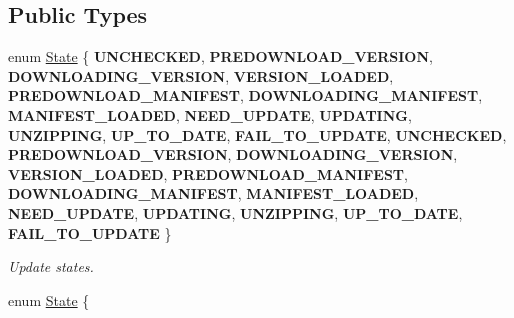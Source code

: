 \subsection*{Public Types}
\begin{DoxyCompactItemize}
\item 
\mbox{\label{classAssetsManagerEx_a50ac8909632de66eb71eb69fa66229c3}} 
enum \hyperlink{classAssetsManagerEx_a50ac8909632de66eb71eb69fa66229c3}{State} \{ \newline
{\bfseries U\+N\+C\+H\+E\+C\+K\+ED}, 
{\bfseries P\+R\+E\+D\+O\+W\+N\+L\+O\+A\+D\+\_\+\+V\+E\+R\+S\+I\+ON}, 
{\bfseries D\+O\+W\+N\+L\+O\+A\+D\+I\+N\+G\+\_\+\+V\+E\+R\+S\+I\+ON}, 
{\bfseries V\+E\+R\+S\+I\+O\+N\+\_\+\+L\+O\+A\+D\+ED}, 
\newline
{\bfseries P\+R\+E\+D\+O\+W\+N\+L\+O\+A\+D\+\_\+\+M\+A\+N\+I\+F\+E\+ST}, 
{\bfseries D\+O\+W\+N\+L\+O\+A\+D\+I\+N\+G\+\_\+\+M\+A\+N\+I\+F\+E\+ST}, 
{\bfseries M\+A\+N\+I\+F\+E\+S\+T\+\_\+\+L\+O\+A\+D\+ED}, 
{\bfseries N\+E\+E\+D\+\_\+\+U\+P\+D\+A\+TE}, 
\newline
{\bfseries U\+P\+D\+A\+T\+I\+NG}, 
{\bfseries U\+N\+Z\+I\+P\+P\+I\+NG}, 
{\bfseries U\+P\+\_\+\+T\+O\+\_\+\+D\+A\+TE}, 
{\bfseries F\+A\+I\+L\+\_\+\+T\+O\+\_\+\+U\+P\+D\+A\+TE}, 
\newline
{\bfseries U\+N\+C\+H\+E\+C\+K\+ED}, 
{\bfseries P\+R\+E\+D\+O\+W\+N\+L\+O\+A\+D\+\_\+\+V\+E\+R\+S\+I\+ON}, 
{\bfseries D\+O\+W\+N\+L\+O\+A\+D\+I\+N\+G\+\_\+\+V\+E\+R\+S\+I\+ON}, 
{\bfseries V\+E\+R\+S\+I\+O\+N\+\_\+\+L\+O\+A\+D\+ED}, 
\newline
{\bfseries P\+R\+E\+D\+O\+W\+N\+L\+O\+A\+D\+\_\+\+M\+A\+N\+I\+F\+E\+ST}, 
{\bfseries D\+O\+W\+N\+L\+O\+A\+D\+I\+N\+G\+\_\+\+M\+A\+N\+I\+F\+E\+ST}, 
{\bfseries M\+A\+N\+I\+F\+E\+S\+T\+\_\+\+L\+O\+A\+D\+ED}, 
{\bfseries N\+E\+E\+D\+\_\+\+U\+P\+D\+A\+TE}, 
\newline
{\bfseries U\+P\+D\+A\+T\+I\+NG}, 
{\bfseries U\+N\+Z\+I\+P\+P\+I\+NG}, 
{\bfseries U\+P\+\_\+\+T\+O\+\_\+\+D\+A\+TE}, 
{\bfseries F\+A\+I\+L\+\_\+\+T\+O\+\_\+\+U\+P\+D\+A\+TE}
 \}\begin{DoxyCompactList}\small\item\em Update states. \end{DoxyCompactList}
\item 
\mbox{\label{classAssetsManagerEx_a50ac8909632de66eb71eb69fa66229c3}} 
enum \hyperlink{classAssetsManagerEx_a50ac8909632de66eb71eb69fa66229c3}{State} \{ \newline

\end{DoxyCompactItemize}
